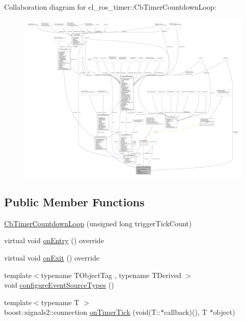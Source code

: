 Collaboration diagram for cl\+\_\+ros\+\_\+timer\+:\+:Cb\+Timer\+Countdown\+Loop\+:
\nopagebreak
\begin{figure}[H]
\begin{center}
\leavevmode
\includegraphics[width=350pt]{classcl__ros__timer_1_1CbTimerCountdownLoop__coll__graph}
\end{center}
\end{figure}
\subsection*{Public Member Functions}
\begin{DoxyCompactItemize}
\item 
\hyperlink{classcl__ros__timer_1_1CbTimerCountdownLoop_a8cdfe250d9469ea019b61051be123195}{Cb\+Timer\+Countdown\+Loop} (unsigned long trigger\+Tick\+Count)
\item 
virtual void \hyperlink{classcl__ros__timer_1_1CbTimerCountdownLoop_aa088f15db4fb2c307c86b30b2e1f7744}{on\+Entry} () override
\item 
virtual void \hyperlink{classcl__ros__timer_1_1CbTimerCountdownLoop_a5623e9fdd8f0fb23e8707f7816c099d6}{on\+Exit} () override
\item 
{\footnotesize template$<$typename T\+Object\+Tag , typename T\+Derived $>$ }\\void \hyperlink{classcl__ros__timer_1_1CbTimerCountdownLoop_a8672075f8a3cbf4ef3f50af0eed8fa53}{configure\+Event\+Source\+Types} ()
\item 
{\footnotesize template$<$typename T $>$ }\\boost\+::signals2\+::connection \hyperlink{classcl__ros__timer_1_1CbTimerCountdownLoop_ad251cc8444ca7070f64658bbb77e1275}{on\+Timer\+Tick} (void(T\+::$\ast$callback)(), T $\ast$object)
\end{DoxyCompactItemize}
